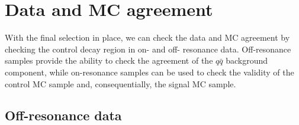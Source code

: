 \section{Data and MC agreement}

With the final selection in place, we can check the data and MC agreement by checking the control decay region in on- and off- resonance data. Off-resonance samples provide the ability to check the agreement of the $q\bar q$ background component, while on-resonance samples can be used to check the validity of the control MC sample and, consequentially, the signal MC sample.

\subsection{Off-resonance data}

